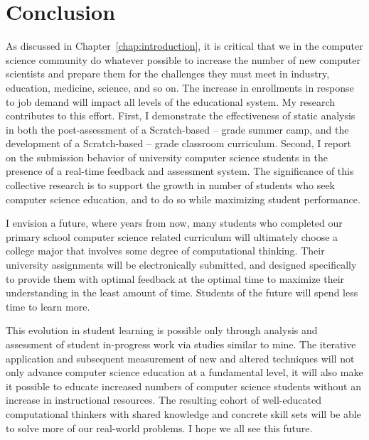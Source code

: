 \chapter{Conclusion} \label{chap:conclusion}

As discussed in Chapter~\ref{chap:introduction}, it is critical that we in the
computer science community do whatever possible to increase the number of new
computer scientists and prepare them for the challenges they must meet in
industry, education, medicine, science, and so on. The increase in enrollments
in response to job demand will impact all levels of the educational system. My
research contributes to this effort. First, I demonstrate the effectiveness of
static analysis in both the post-assessment of a Scratch-based --
grade summer camp, and the development of a Scratch-based --
grade classroom curriculum. Second, I report on the submission behavior of
university computer science students in the presence of a real-time feedback
and assessment system. The significance of this collective research is to
support the growth in number of students who seek computer science education,
and to do so while maximizing student performance.

I envision a future, where years from now, many students who completed our
primary school computer science related curriculum will ultimately choose a
college major that involves some degree of computational thinking. Their
university assignments will be electronically submitted, and designed
specifically to provide them with optimal feedback at the optimal time to
maximize their understanding in the least amount of time. Students of the
future will spend less time to learn more.

This evolution in student learning is possible only through analysis and
assessment of student in-progress work via studies similar to mine. The
iterative application and subsequent measurement of new and altered techniques
will not only advance computer science education at a fundamental level, it
will also make it possible to educate increased numbers of computer science
students without an increase in instructional resources. The resulting cohort
of well-educated computational thinkers with shared knowledge and concrete
skill sets will be able to solve more of our real-world problems. I hope we all
see this future.
